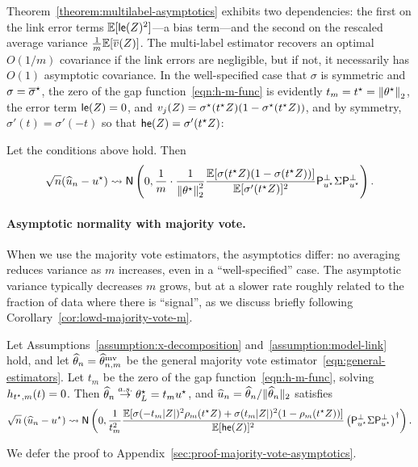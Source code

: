 Theorem~\ref{theorem:multilabel-asymptotics} exhibits two dependencies: the
first on the link error terms $\mathbb{E}[\mathsf{le}(Z)^2]$---a bias
term---and the second on the rescaled average variance $\frac{1}{m}
\mathbb{E}[\overline{v}(Z)]$. The multi-label estimator recovers
an optimal $O(1/m)$ covariance if the link errors are negligible, but if
not, it necessarily has $O(1)$ asymptotic covariance.
%
%
In the well-specified
case that $\sigma$ is symmetric and $\sigma = \overline{\sigma}^\star$, 
the zero of the gap
function~\eqref{eqn:h-m-func} is evidently $t_m = t^\star =
\left\|{\theta^\star}\right\|_2$, the error term $\mathsf{le}(Z) = 0$,
and $v_j(Z) = \sigma^\star(t^\star Z)(1 - \sigma^\star(t^\star Z))$, and by symmetry,
$\sigma'(t) = \sigma'(-t)$ so that
$\mathsf{he}(Z) = \sigma'(t^\star Z)$:
\begin{corollary} \label{cor:well-specified-normalized-cov}
	Let the conditions above hold. Then
	\begin{equation*}
		\sqrt{n}(\widehat{u}_n - u^\star)
		\rightsquigarrow \mathsf{N}\left(0, \frac{1}{m} \cdot
		\frac{1}{\left\|{\theta^\star}\right\|_2^2}
		\frac{\mathbb{E}[\sigma(t^\star Z) (1 - \sigma(t^\star Z))]}{\mathbb{E}[\sigma'(t^\star Z)]^2}
		\mathsf{P}_{u^\star}^\perp \Sigma \mathsf{P}_{u^\star}^\perp \right).
	\end{equation*}
\end{corollary}

\paragraph{Asymptotic normality with majority vote.}
When we use the majority vote estimators, the asymptotics differ:
no averaging reduces variance as $m$ increases, even in a
``well-specified'' case. The asymptotic variance typically decreases
$m$ grows, but at a slower rate roughly related to
the fraction of data where there is ``signal'', as we discuss
briefly following Corollary~\ref{cor:lowd-majority-vote-m}.
\begin{theorem}
  \label{theorem:majority-vote-asymptotics}
  Let Assumptions~\ref{assumption:x-decomposition}
  and~\ref{assumption:model-link} hold, and let $\widehat{\theta}_n = \widehat{\theta}^{\textup{mv}}_{n,m}$ be
  the general majority vote
  estimator~\eqref{eqn:general-estimators}. Let $t_m$ be
  the zero of the gap function~\eqref{eqn:h-m-func}, solving
  $h_{t^\star,m} (t) = 0$.  Then $\widehat{\theta}_n \stackrel{a.s.}{\rightarrow}
  \theta^\star_L = t_m u^\star$, and $\widehat{u}_n = \widehat{\theta}_n /
  \|{\widehat{\theta}_n}\|_2$ satisfies
  \begin{equation*}
    \sqrt{n} \left(\widehat{u}_n - u^\star\right)
    \rightsquigarrow \mathsf{N}\left(0, \frac{1}{t_m^2}
    \frac{\mathbb{E}[\sigma(-t_m |Z|)^2 \rho_m(t^\star Z) + \sigma(t_m |Z|)^2
	(1 - \rho_m(t^\star Z))]}{\mathbb{E}[\mathsf{he}(Z)]^2}
    \left({\mathsf{P}_{u^\star}^\perp \Sigma \mathsf{P}_{u^\star}^\perp}\right)^\dagger \right).
	\end{equation*}
\end{theorem}
\noindent
We defer the proof to Appendix~\ref{sec:proof-majority-vote-asymptotics}.

